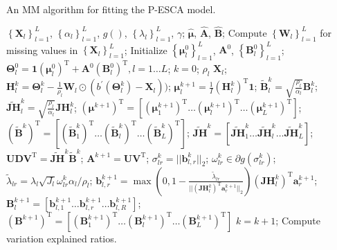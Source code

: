\begin{algorithm}[h!]
  \caption{An MM algorithm for fitting the P-ESCA model.}
  \label{alg:pESCA}
  \begin{algorithmic}[1]
    \Require
      $\left\{\mathbf{X}_l\right\}_{l=1}^{L}$, $\left\{\alpha_l\right\}_{l=1}^{L}$, $g()$, $\left\{\lambda_l\right\}_{l=1}^{L}$, $\gamma$;
    \Ensure
      $\hat{\bm{\mu}}$, $\hat{\mathbf{A}}$, $\hat{\mathbf{B}}$;
    \State Compute $\left\{\mathbf{W}_l\right\}_{l=1}^{L}$ for missing values in $\left\{\mathbf{X}_l\right\}_{l=1}^{L}$;
    \State Initialize $\left\{\bm{\mu}_l^0\right\}_{l=1}^{L}$, $\mathbf{A}^0$, $\left\{\mathbf{B}_l^0\right\}_{l=1}^{L}$;
    \State $\mathbf{\Theta}_l^0 = \mathbf{1}(\bm{\mu}_l^0)^{\text{T}} + \mathbf{A}^0(\mathbf{B}_l^0)^{\text{T}}, l = 1 \ldots L$;
    \State $k = 0$;
            \State {} $\rho_l$  $\mathbf{X}_l$;
            \State  $\mathbf{H}_{l}^{k} = \mathbf{\Theta}_l^k - \frac{1}{\rho_l} \mathbf{W}_l \odot (b^{'}(\mathbf{\Theta}_{l}^{k}) - \mathbf{X}_l))$;
            \State $\bm{\mu}_l^{k+1} = \frac{1}{I} (\mathbf{H}_l^k)^{\text{T}} \mathbf{1}$;
            \State $\widetilde{\mathbf{B}}_l^{k} = \sqrt{\frac{\rho_l}{\alpha_l}} \mathbf{B}_l^{k}$;
            \State $\widetilde{\mathbf{JH}}_l^k = \sqrt{\frac{\rho_l}{\alpha_l}} \mathbf{JH}_{l}^{k}$;
        \EndFor
        \State $(\bm{\mu}^{k+1})^{\text{T}} = [(\bm{\mu}_1^{k+1})^{\text{T}} \ldots (\bm{\mu}_l^{k+1})^{\text{T}} \ldots (\bm{\mu}_L^{k+1})^{\text{T}}]$;
        \State $(\widetilde{\mathbf{B}}^k)^{\text{T}} = [(\widetilde{\mathbf{B}}_1^k)^{\text{T}}  \ldots (\widetilde{\mathbf{B}}_l^k)^{\text{T}} \ldots (\widetilde{\mathbf{B}}_L^k)^{\text{T}}]$;
        \State $\widetilde{\mathbf{JH}}^k = [\widetilde{\mathbf{JH}}_1^k \ldots \widetilde{\mathbf{JH}}_l^k \ldots \widetilde{\mathbf{JH}}_L^k]$;
        \State $\mathbf{UDV}^{\text{T}} = \widetilde{\mathbf{JH}}^{k} \widetilde{\mathbf{B}}^k$;
        \State $\mathbf{A}^{k+1} = \mathbf{UV}^{\text{T}}$;
                \State $\sigma_{lr}^k = ||\mathbf{b}_{l,r}^k||_2$;
                \State $\omega_{lr}^k \in \partial g(\sigma_{lr}^k)$;
                \State $\tilde{\lambda}_{lr} = \lambda_l \sqrt{J_l} \omega_{lr}^k \alpha_l/\rho_l$;
                \State $\mathbf{b}_{l,r}^{k+1} = \max(0, 1- \frac{\tilde{\lambda}_{lr}}{||(\mathbf{JH}_{l}^{k})^{\text{T}} \mathbf{a}_r^{k+1}||_2}) (\mathbf{JH}_{l}^{k})^{\text{T}} \mathbf{a}_r^{k+1}$;
             \EndFor
             \State $\mathbf{B}_{l}^{k+1} = [\mathbf{b}_{l,1}^{k+1} \ldots \mathbf{b}_{l,r}^{k+1} \ldots \mathbf{b}_{l,R}^{k+1}]$;
        \EndFor
        \State $(\mathbf{B}^{k+1})^{\text{T}} = [(\mathbf{B}_{1}^{k+1})^{\text{T}} \ldots (\mathbf{B}_{l}^{k+1})^{\text{T}} \ldots (\mathbf{B}_{L}^{k+1})^{\text{T}}]$
        \State $k=k+1$;
    \EndWhile
    \State Compute variation explained ratios.
  \end{algorithmic}
\end{algorithm}

